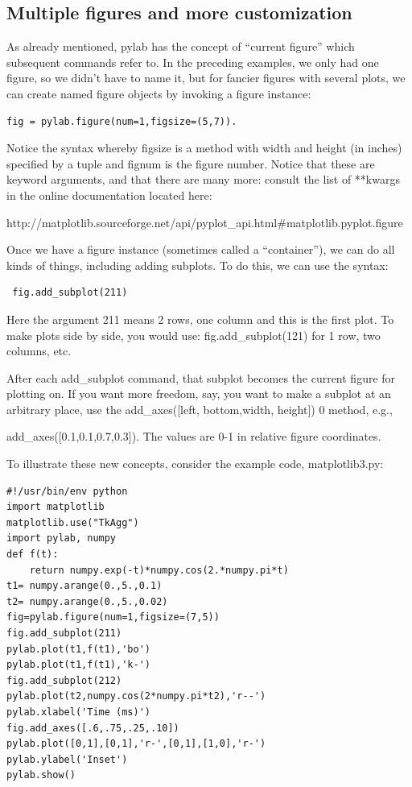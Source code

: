 \documentclass[11pt]{book}
\begin{document}
{\subsection{Multiple figures and more customization}
As already mentioned,  {\color{blue}pylab} has the concept of ``current figure'' which subsequent commands refer to.   In the preceding examples, we only had one figure, so we didn't have to name it, but for fancier figures with several plots, we 
can create  named figure objects by invoking a {\color{blue}figure} instance: 
 
 {\color{blue}\begin{verbatim}
fig = pylab.figure(num=1,figsize=(5,7)). 
\end{verbatim}}

\noindent  Notice the syntax whereby {\color{blue} figsize}  is a method with  width and height (in inches) specified by a tuple and {\color{blue}fignum}  is the figure number.    Notice that these are keyword arguments, and that there are many more:  consult the list of  **kwargs in the online documentation  located here:

 http://matplotlib.sourceforge.net/api/pyplot\_api.html\#matplotlib.pyplot.figure 

Once we have a figure instance (sometimes called a ``container''), we can do all kinds of things, including adding subplots.  To do this, we can use the syntax:

{\color{blue}\begin{verbatim}
 fig.add_subplot(211) 
 \end{verbatim}}
 \noindent Here the 
argument  211 means 2 rows, one column and this is the first plot.  To make plots side by side, you would use: {\color{blue} fig.add\_subplot(121) } for  1 row, two columns, etc.  

After each {\color{blue}add\_subplot} command, that subplot becomes the current figure for plotting on.
If you want more freedom, say, you want to make a subplot at an arbitrary place,  use the {\color{blue}add\_axes([left, bottom,width, height])} 0 method, e.g.,  {{\color{blue}add\_axes([0.1,0.1,0.7,0.3])}.  The values are 0-1 in relative figure coordinates. 

To illustrate these new concepts, consider the example code, {\color{blue}matplotlib3.py}:

{ \color{blue} \begin{verbatim}
#!/usr/bin/env python
import matplotlib
matplotlib.use("TkAgg")
import pylab, numpy
def f(t):
    return numpy.exp(-t)*numpy.cos(2.*numpy.pi*t)
t1= numpy.arange(0.,5.,0.1)
t2= numpy.arange(0.,5.,0.02)
fig=pylab.figure(num=1,figsize=(7,5)) 
fig.add_subplot(211) 
pylab.plot(t1,f(t1),'bo')
pylab.plot(t1,f(t1),'k-') 
fig.add_subplot(212) 
pylab.plot(t2,numpy.cos(2*numpy.pi*t2),'r--')
pylab.xlabel('Time (ms)')
fig.add_axes([.6,.75,.25,.10])
pylab.plot([0,1],[0,1],'r-',[0,1],[1,0],'r-')
pylab.ylabel('Inset')
pylab.show()
\end{verbatim}}

}}
\end{document}
